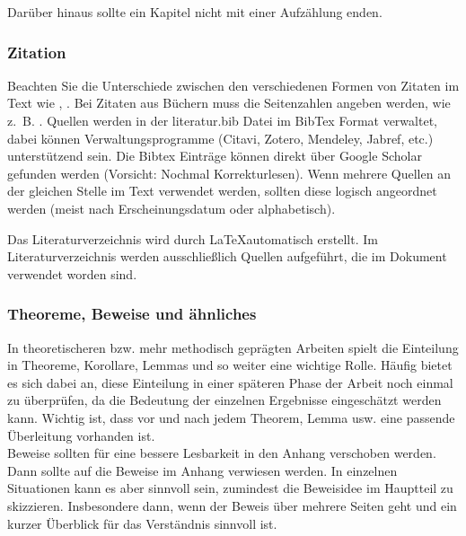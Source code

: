 Darüber hinaus sollte ein Kapitel nicht mit einer Aufzählung enden.

\subsubsection{Zitation}
Beachten Sie die Unterschiede zwischen den verschiedenen Formen von Zitaten im Text wie \citet{kaplan1958nonparametric}, \citep{kaplan1958nonparametric}. Bei Zitaten aus Büchern muss die Seitenzahlen angeben werden, wie z.~B. \citet[S.~123]{friedman2017elements}. Quellen werden in der literatur.bib Datei im BibTex Format verwaltet, dabei können Verwaltungsprogramme (Citavi, Zotero, Mendeley, Jabref, etc.) unterstützend sein. Die Bibtex Einträge können direkt über Google Scholar gefunden werden (Vorsicht: Nochmal Korrekturlesen).
Wenn mehrere Quellen an der gleichen Stelle im Text verwendet werden, sollten diese logisch angeordnet werden (meist nach Erscheinungsdatum oder alphabetisch).

Das Literaturverzeichnis wird durch \LaTeX automatisch erstellt. Im Literaturverzeichnis werden ausschließlich Quellen aufgeführt, die im Dokument verwendet worden sind.
\subsubsection{Theoreme, Beweise und ähnliches}
In theoretischeren bzw. mehr methodisch geprägten Arbeiten spielt die Einteilung in Theoreme, Korollare, Lemmas und so weiter eine wichtige Rolle. Häufig bietet es sich dabei an, diese Einteilung in einer späteren Phase der Arbeit noch einmal zu überprüfen, da die Bedeutung der einzelnen Ergebnisse eingeschätzt werden kann. Wichtig ist, dass vor und nach jedem Theorem, Lemma usw. eine passende Überleitung vorhanden ist. \\
Beweise sollten für eine bessere Lesbarkeit in den Anhang verschoben werden. Dann sollte auf die Beweise im Anhang verwiesen werden. In einzelnen Situationen kann es aber sinnvoll sein, zumindest die Beweisidee im Hauptteil zu skizzieren. Insbesondere dann, wenn der Beweis über mehrere Seiten geht und ein kurzer Überblick für das Verständnis sinnvoll ist.  